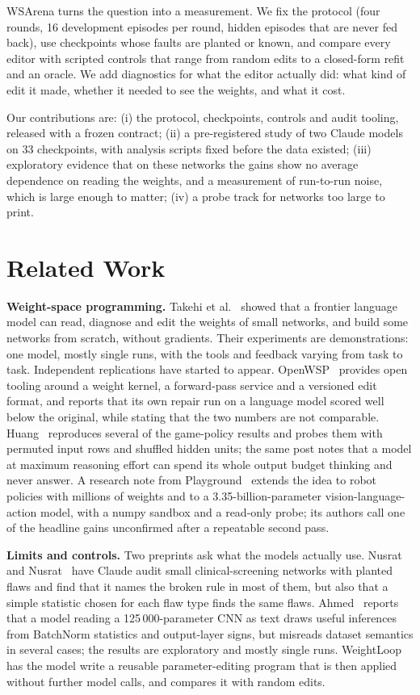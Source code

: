 \documentclass[conference]{IEEEtran}
\begin{document}
WSArena turns the question into a measurement. We fix the protocol (four rounds, 16 development episodes per round, hidden episodes that are never fed back), use checkpoints whose faults are planted or known, and compare every editor with scripted controls that range from random edits to a closed-form refit and an oracle. We add diagnostics for what the editor actually did: what kind of edit it made, whether it needed to see the weights, and what it cost.

Our contributions are: (i) the protocol, checkpoints, controls and audit tooling, released with a frozen contract; (ii) a pre-registered study of two Claude models on 33 checkpoints, with analysis scripts fixed before the data existed; (iii) exploratory evidence that on these networks the gains show no average dependence on reading the weights, and a measurement of run-to-run noise, which is large enough to matter; (iv) a probe track for networks too large to print.

\section{Related Work}
\textbf{Weight-space programming.} Takehi et al.~\cite{takehi2026sparks} showed that a frontier language model can read, diagnose and edit the weights of small networks, and build some networks from scratch, without gradients. Their experiments are demonstrations: one model, mostly single runs, with the tools and feedback varying from task to task. Independent replications have started to appear. OpenWSP~\cite{openwsp2026} provides open tooling around a weight kernel, a forward-pass service and a versioned edit format, and reports that its own repair run on a language model scored well below the original, while stating that the two numbers are not comparable. Huang~\cite{huang2026break} reproduces several of the game-policy results and probes them with permuted input rows and shuffled hidden units; the same post notes that a model at maximum reasoning effort can spend its whole output budget thinking and never answer. A research note from Playground~\cite{playground2026robotics} extends the idea to robot policies with millions of weights and to a 3.35-billion-parameter vision-language-action model, with a numpy sandbox and a read-only probe; its authors call one of the headline gains unconfirmed after a repeatable second pass.

\textbf{Limits and controls.} Two preprints ask what the models actually use. Nusrat and Nusrat~\cite{nusrat2026clinical} have Claude audit small clinical-screening networks with planted flaws and find that it names the broken rule in most of them, but also that a simple statistic chosen for each flaw type finds the same flaws. Ahmed~\cite{ahmed2026reason} reports that a model reading a 125\,000-parameter CNN as text draws useful inferences from BatchNorm statistics and output-layer signs, but misreads dataset semantics in several cases; the results are exploratory and mostly single runs. WeightLoop~\cite{li2026weightloop} has the model write a reusable parameter-editing program that is then applied without further model calls, and compares it with random edits.
\end{document}
